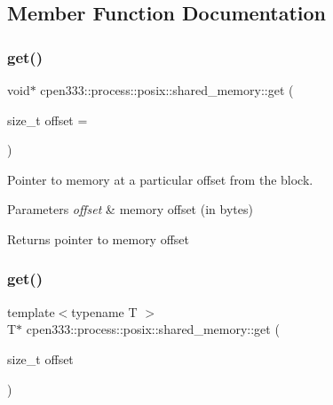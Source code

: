 \subsection{Member Function Documentation}
\mbox{\label{classcpen333_1_1process_1_1posix_1_1shared__memory_ae97ceec75dc83d43a995daac4769504d}} 
\subsubsection{\texorpdfstring{get()}{get()}\hspace{0.1cm}{\footnotesize\ttfamily [1/3]}}
{\footnotesize\ttfamily void$\ast$ cpen333\+::process\+::posix\+::shared\+\_\+memory\+::get (\begin{DoxyParamCaption}\item[{size\+\_\+t}]{offset = {} }\end{DoxyParamCaption})\hspace{0.3cm}{\ttfamily [inline]}}



Pointer to memory at a particular offset from the block. 


\begin{DoxyParams}{Parameters}
{\em offset} & memory offset (in bytes) \\
\hline
\end{DoxyParams}
\begin{DoxyReturn}{Returns}
pointer to memory offset 
\end{DoxyReturn}
\mbox{\label{classcpen333_1_1process_1_1posix_1_1shared__memory_a09582d7b2863aebbbd74d2f32d0b1af8}} 
\subsubsection{\texorpdfstring{get()}{get()}\hspace{0.1cm}{\footnotesize\ttfamily [2/3]}}
{\footnotesize\ttfamily template$<$typename T $>$ \\
T$\ast$ cpen333\+::process\+::posix\+::shared\+\_\+memory\+::get (\begin{DoxyParamCaption}\item[{size\+\_\+t}]{offset }\end{DoxyParamCaption})\hspace{0.3cm}{\ttfamily [inline]}}



